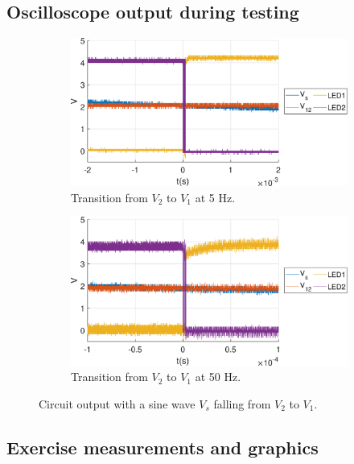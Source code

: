 \documentclass{article}
\begin{document}
\subsection{Oscilloscope output during testing}
\begin{figure}[H]
	\centering
	\begin{subfigure}{.5\linewidth}
		\centering
		\includegraphics[keepaspectratio,width=.98\linewidth]{5hz_all.eps}
		\caption{Transition from $V_2$ to $V_1$ at 5 Hz.}
	\end{subfigure}%
	\begin{subfigure}{.5\linewidth}
		\centering
		\includegraphics[keepaspectratio,width=.98\linewidth]{50hz_all.eps}
		\caption{Transition from $V_2$ to $V_1$ at 50 Hz.}
	\end{subfigure}
\caption{Circuit output with a sine wave $V_s$ falling from $V_2$ to $V_1$.}
\end{figure}
\subsection{Exercise measurements and graphics}
\end{document}
